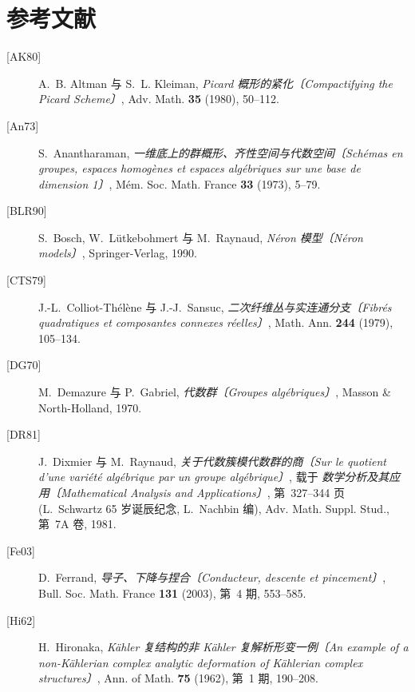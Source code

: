 \section*{参考文献\protect\footnotemark}
\label{sec:sga3-V-bibliography}

\begin{description}
\item[{[AK80]}]\label{bib:sga3-V-AK80} A.~B. Altman 与 S.~L. Kleiman,
  \emph{Picard 概形的紧化〔Compactifying the Picard Scheme〕}, Adv. Math. \textbf{35}
  (1980), 50--112.
\item[{[An73]}]\label{bib:sga3-V-An73} S.~Anantharaman,
  \emph{一维底上的群概形、齐性空间与代数空间〔Sch\'emas en groupes, espaces homog\`enes et espaces
  alg\'ebriques sur une base de dimension 1〕}, M\'em. Soc. Math.
  France \textbf{33} (1973), 5--79.
\item[{[BLR90]}]\label{bib:sga3-V-BLR90} S.~Bosch, W.~L\"utkebohmert 与 M.~Raynaud,
  \emph{Néron 模型〔N\'eron models〕}, Springer-Verlag, 1990.
\item[{[CTS79]}]\label{bib:sga3-V-CTS79} J.-L.~Colliot-Th\'el\`ene 与 J.-J.~Sansuc,
  \emph{二次纤维丛与实连通分支〔Fibr\'es quadratiques et composantes connexes r\'eelles〕},
  Math. Ann. \textbf{244} (1979), 105--134.
\item[{[DG70]}]\label{bib:sga3-V-DG70} M.~Demazure 与 P.~Gabriel,
  \emph{代数群〔Groupes alg\'ebriques〕}, Masson \& North-Holland, 1970.
\item[{[DR81]}]\label{bib:sga3-V-DR81} J.~Dixmier 与 M.~Raynaud,
  \emph{关于代数簇模代数群的商〔Sur le quotient d'une vari\'et\'e alg\'ebrique par un groupe
  alg\'ebrique〕}, 载于 \emph{数学分析及其应用〔Mathematical Analysis and
  Applications〕}, 第~327--344 页 (L.~Schwartz 65 岁诞辰纪念, L.~Nachbin 编), Adv.
  Math. Suppl. Stud., 第~7A 卷, 1981.
\item[{[Fe03]}]\label{bib:sga3-V-Fe03} D.~Ferrand,
  \emph{导子、下降与捏合〔Conducteur, descente et pincement〕}, Bull. Soc. Math. France
  \textbf{131} (2003), 第~4 期, 553--585.
\item[{[Hi62]}]\label{bib:sga3-V-Hi62} H.~Hironaka,
  \emph{Kähler 复结构的非 Kähler 复解析形变一例〔An example of a non-K\"ahlerian complex analytic deformation
  of K\"ahlerian complex structures〕}, Ann. of Math. \textbf{75}
  (1962), 第~1 期, 190--208.

\end{description}
